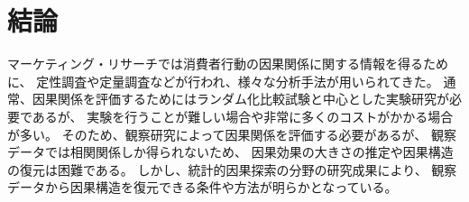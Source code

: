 
\section{結論}
\label{part:conclusion}

マーケティング・リサーチでは消費者行動の因果関係に関する情報を得るために、
定性調査や定量調査などが行われ、様々な分析手法が用いられてきた。
通常、因果関係を評価するためにはランダム化比較試験と中心とした実験研究が必要であるが、
実験を行うことが難しい場合や非常に多くのコストがかかる場合が多い。
そのため、観察研究によって因果関係を評価する必要があるが、
観察データでは相関関係しか得られないため、
因果効果の大きさの推定や因果構造の復元は困難である。
しかし、統計的因果探索の分野の研究成果により、
観察データから因果構造を復元できる条件や方法が明らかとなっている。






